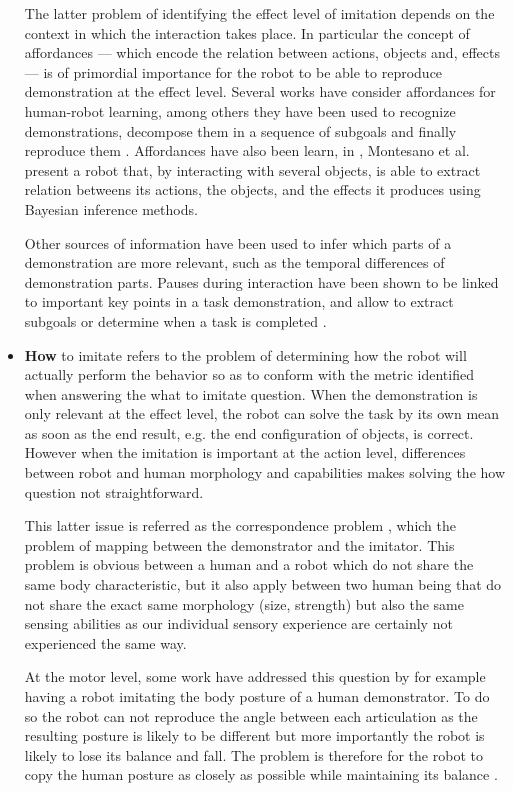 \begin{itemize}
The latter problem of identifying the effect level of imitation depends on the context in which the interaction takes place. In particular the concept of affordances \cite{gibson1986ecological} --- which encode the relation between actions, objects and, effects --- is of primordial importance for the robot to be able to reproduce demonstration at the effect level. Several works have consider affordances for human-robot learning, among others they have been used to recognize demonstrations, decompose them in a sequence of subgoals and finally reproduce them \cite{macl07affimit}. Affordances have also been learn, in \cite{montesano2008learning}, Montesano et al. present a robot that, by interacting with several objects, is able to extract relation betweens its actions, the objects, and the effects it produces using Bayesian inference methods.

Other sources of information have been used to infer which parts of a demonstration are more relevant, such as the temporal differences of demonstration parts. Pauses during interaction have been shown to be linked to important key points in a task demonstration, and allow to extract subgoals or determine when a task is completed \cite{theofilis2013temporal}.

\item \textbf{How} to imitate refers to the problem of determining how the robot will actually perform the behavior so as to conform with the metric identified when answering the what to imitate question. When the demonstration is only relevant at the effect level, the robot can solve the task by its own mean as soon as the end result, e.g. the end configuration of objects, is correct. However when the imitation is important at the action level, differences between robot and human morphology and capabilities makes solving the how question not straightforward.

This latter issue is referred as the correspondence problem \cite{nehaniv2002correspondence}, which the problem of mapping between the demonstrator and the imitator. This problem is obvious between a human and a robot which do not share the same body characteristic, but it also apply between two human being that do not share the exact same morphology (size, strength) but also the same sensing abilities as our individual sensory experience are certainly not experienced the same way.

At the motor level, some work have addressed this question by for example having a robot imitating the body posture of a human demonstrator. To do so the robot can not reproduce the angle between each articulation as the resulting posture is likely to be different but more importantly the robot is likely to lose its balance and fall. The problem is therefore for the robot to copy the human posture as closely as possible while maintaining its balance \cite{hyon2007full,yamane2009simultaneous}. 


\end{itemize}
